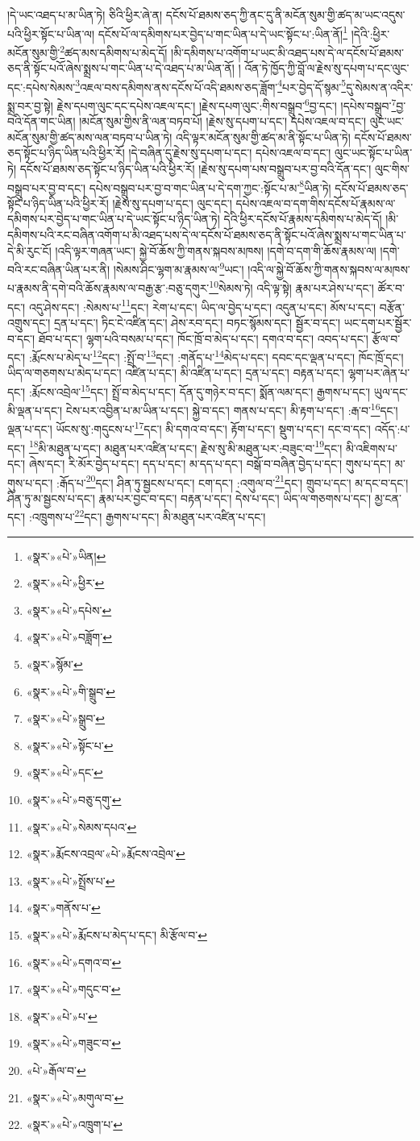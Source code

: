 །དེ་ཡང་འཐད་པ་མ་ཡིན་ཏེ། ཅིའི་ཕྱིར་ཞེ་ན། དངོས་པོ་ཐམས་ཅད་ཀྱི་ནང་དུ་ནི་མངོན་སུམ་གྱི་ཚད་མ་ཡང་འདུས་པའི་ཕྱིར་སྟོང་པ་ཡིན་ལ། དངོས་པོ་ལ་དམིགས་པར་བྱེད་པ་གང་ཡིན་པ་དེ་ཡང་སྟོང་པ་:ཡིན་ནོ།\footnote{«སྣར་»«པེ་»ཡིན།} །དེའི་:ཕྱིར་མངོན་སུམ་གྱི་\footnote{«སྣར་»«པེ་»ཕྱིར་}ཚད་མས་དམིགས་པ་མེད་དོ། །མི་དམིགས་པ་འགོག་པ་ཡང་མི་འཐད་པས་དེ་ལ་དངོས་པོ་ཐམས་ཅད་ནི་སྟོང་པའོ་ཞེས་སྨྲས་པ་གང་ཡིན་པ་དེ་འཐད་པ་མ་ཡིན་ནོ། །
འོན་ཏེ་ཁྱོད་ཀྱི་བློ་ལ་རྗེས་སུ་དཔག་པ་དང་ལུང་དང་:དཔེས་སེམས་\footnote{«སྣར་»«པེ་»དཔེས་}འཇལ་བས་དམིགས་ནས་དངོས་པོ་འདི་ཐམས་ཅད་ཟློག་\footnote{«སྣར་»«པེ་»བཟློག་}པར་བྱེད་དོ་སྙམ་\footnote{«སྣར་»སྙོམ་}དུ་སེམས་ན་འདིར་སྨྲ་བར་བྱ་སྟེ། རྗེས་དཔག་ལུང་དང་དཔེས་འཇལ་དང་། །རྗེས་དཔག་ལུང་:གིས་བསྒྲུབ་\footnote{«སྣར་»«པེ་»གི་སྒྲུབ་}བྱ་དང་། །དཔེས་བསྒྲུབ་\footnote{«སྣར་»«པེ་»སྒྲུབ་}བྱ་བའི་དོན་གང་ཡིན། །མངོན་སུམ་གྱིས་ནི་ལན་བཏབ་པོ། །རྗེས་སུ་དཔག་པ་དང་། དཔེས་འཇལ་བ་དང་། ལུང་ཡང་མངོན་སུམ་གྱི་ཚད་མས་ལན་བཏབ་པ་ཡིན་ཏེ། འདི་ལྟར་མངོན་སུམ་གྱི་ཚད་མ་ནི་སྟོང་པ་ཡིན་ཏེ། དངོས་པོ་ཐམས་ཅད་སྟོང་པ་ཉིད་ཡིན་པའི་ཕྱིར་རོ། །དེ་བཞིན་དུ་རྗེས་སུ་དཔག་པ་དང་། དཔེས་འཇལ་བ་དང་། ལུང་ཡང་སྟོང་པ་ཡིན་ཏེ། དངོས་པོ་ཐམས་ཅད་སྟོང་པ་ཉིད་ཡིན་པའི་ཕྱིར་རོ། །རྗེས་སུ་དཔག་པས་བསྒྲུབ་པར་བྱ་བའི་དོན་དང་། ལུང་གིས་བསྒྲུབ་པར་བྱ་བ་དང་། དཔེས་བསྒྲུབ་པར་བྱ་བ་གང་ཡིན་པ་དེ་དག་ཀྱང་:སྟོང་པ་མ་\footnote{«སྣར་»«པེ་»སྟོང་པ་}ཡིན་ཏེ། དངོས་པོ་ཐམས་ཅད་སྟོང་པ་ཉིད་ཡིན་པའི་ཕྱིར་རོ། །རྗེས་སུ་དཔག་པ་དང་། ལུང་དང་། དཔེས་འཇལ་བ་དག་གིས་དངོས་པོ་རྣམས་ལ་དམིགས་པར་བྱེད་པ་གང་ཡིན་པ་དེ་ཡང་སྟོང་པ་ཉིད་ཡིན་ཏེ། དེའི་ཕྱིར་དངོས་པོ་རྣམས་དམིགས་པ་མེད་དོ། །མི་དམིགས་པའི་རང་བཞིན་འགོག་པ་མི་འཐད་པས་དེ་ལ་དངོས་པོ་ཐམས་ཅད་ནི་སྟོང་པའོ་ཞེས་སྨྲས་པ་གང་ཡིན་པ་དེ་མི་རུང་ངོ། །འདི་ལྟར་གཞན་ཡང་། སྐྱེ་བོ་ཆོས་ཀྱི་གནས་སྐབས་མཁས། །དགེ་བ་དག་གི་ཆོས་རྣམས་ལ། །དགེ་བའི་རང་བཞིན་ཡིན་པར་ནི། །སེམས་ཤིང་ལྷག་མ་རྣམས་ལ་\footnote{«སྣར་»«པེ་»དང་}ཡང་། །འདི་ལ་སྐྱེ་བོ་ཆོས་ཀྱི་གནས་སྐབས་ལ་མཁས་པ་རྣམས་ནི་དགེ་བའི་ཆོས་རྣམས་ལ་བརྒྱ་རྩ་:བཅུ་དགུར་\footnote{«སྣར་»«པེ་»བཅུ་དགུ་}སེམས་ཏེ། འདི་ལྟ་སྟེ། རྣམ་པར་ཤེས་པ་དང་། ཚོར་བ་དང་། འདུ་ཤེས་དང་། :སེམས་པ་\footnote{«སྣར་»«པེ་»སེམས་དཔའ་}དང་། རེག་པ་དང་། ཡིད་ལ་བྱེད་པ་དང་། འདུན་པ་དང་། མོས་པ་དང་། བརྩོན་འགྲུས་དང་། དྲན་པ་དང་། ཏིང་ངེ་འཛིན་དང་། ཤེས་རབ་དང་། བཏང་སྙོམས་དང་། སྦྱོར་བ་དང་། ཡང་དག་པར་སྦྱོར་བ་དང་། ཐོབ་པ་དང་། ལྷག་པའི་བསམ་པ་དང་། ཁོང་ཁྲོ་བ་མེད་པ་དང་། དགའ་བ་དང་། འབད་པ་དང་། རྩོལ་བ་དང་། :རྨོངས་པ་མེད་པ་\footnote{«སྣར་»རྨོངས་འབྲལ་«པེ་»རྨོངས་འབྲེལ་}དང་། :སྤྲོ་བ་\footnote{«སྣར་»«པེ་»སྤྲོས་པ་}དང་། :གནོད་པ་\footnote{«སྣར་»གནོས་པ་}མེད་པ་དང་། དབང་དང་ལྡན་པ་དང་། ཁོང་ཁྲོ་དང་། ཡིད་ལ་གཅགས་པ་མེད་པ་དང་། འཛིན་པ་དང་། མི་འཛིན་པ་དང་། དྲན་པ་དང་། བརྟན་པ་དང་། ལྷག་པར་ཞེན་པ་དང་། :རྨོངས་འབྲེལ་\footnote{«སྣར་»«པེ་»རྨོངས་པ་མེད་པ་དང་། མི་རྩོལ་བ་}དང་། སྤྲོ་བ་མེད་པ་དང་། དོན་དུ་གཉེར་བ་དང་། སྨོན་ལམ་དང་། རྒྱགས་པ་དང་། ཡུལ་དང་མི་ལྡན་པ་དང་། ངེས་པར་འབྱིན་པ་མ་ཡིན་པ་དང་། སྐྱེ་བ་དང་། གནས་པ་དང་། མི་རྟག་པ་དང་། :རྒ་བ་\footnote{«སྣར་»«པེ་»དགའ་བ་}དང་། ལྡན་པ་དང་། ཡོངས་སུ་:གདུངས་པ་\footnote{«སྣར་»«པེ་»གདུང་བ་}དང་། མི་དགའ་བ་དང་། རྟོག་པ་དང་། སྡུག་པ་དང་། དང་བ་དང་། འདོད་:པ་དང་། \footnote{«སྣར་»«པེ་»པ་}མི་མཐུན་པ་དང་། མཐུན་པར་འཛིན་པ་དང་། རྗེས་སུ་མི་མཐུན་པར་:བཟུང་བ་\footnote{«སྣར་»«པེ་»གཟུང་བ་}དང་། མི་འཇིགས་པ་དང་། ཞེས་དང་། རི་མོར་བྱེད་པ་དང་། དད་པ་དང་། མ་དད་པ་དང་། བསྒོ་བ་བཞིན་བྱེད་པ་དང་། གུས་པ་དང་། མ་གུས་པ་དང་། :རྒོད་པ་\footnote{«པེ་»རྒོལ་བ་}དང་། ཤིན་ཏུ་སྦྱངས་པ་དང་། ངག་དང་། :འགུལ་བ་\footnote{«སྣར་»«པེ་»མགུལ་བ་}དང་། གྲུབ་པ་དང་། མ་དང་བ་དང་། ཤིན་ཏུ་མ་སྦྱངས་པ་དང་། རྣམ་པར་བྱང་བ་དང་། བརྟན་པ་དང་། དེས་པ་དང་། ཡིད་ལ་གཅགས་པ་དང་། མྱ་ངན་དང་། :འཁྲུགས་པ་\footnote{«སྣར་»«པེ་»འཁྲུག་པ་}དང་། རྒྱགས་པ་དང་། མི་མཐུན་པར་འཛིན་པ་དང་། 